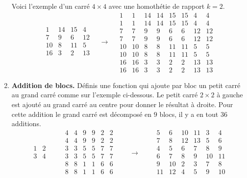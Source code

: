 \documentclass[11pt,class=report,crop=false]{standalone}
\begin{document}
\begin{activite}
\begin{enumerate}
Voici l'exemple d'un carré $4\times 4$ avec une homothétie de rapport $k=2$.
$$  
  \begin{array}{c|c|c|c}  
  1& 14& 15& 4\\\hline
  7& 9& 6& 12\\\hline
  10& 8& 11& 5\\\hline
  16& 3& 2& 13\\    
  \end{array} 
\quad  \longrightarrow \quad 
  \begin{array}{cc|cc|cc|cc}
 1& 1&14&14&15&15& 4& 4\\
  1& 1&14&14&15&15& 4& 4\\\hline
  7& 7& 9& 9& 6& 6&12&12\\
  7& 7& 9& 9& 6& 6&12&12\\\hline
 10&10& 8& 8&11&11& 5& 5\\
 10&10& 8& 8&11&11& 5& 5\\\hline
 16&16& 3& 3& 2& 2&13&13\\
 16&16& 3& 3& 2& 2&13&13
 \end{array}
  $$
  
\item \textbf{Addition de blocs.} Définis une fonction  qui ajoute par bloc un petit carré au grand carré comme sur l'exemple ci-dessous. Le petit carré $2 \times 2$ à gauche est ajouté au grand carré au centre pour donner le résultat à droite. Pour cette addition le grand carré est décomposé en $9$ blocs, il y a en tout $36$ additions.
$$
  \begin{array}{cc} 
  1& 2  \\
  3& 4  \\
  \end{array}
  \qquad
  \begin{array}{cc|cc|cc}  
  4& 4& 9& 9& 2& 2  \\
  4& 4& 9& 9& 2& 2  \\\hline
  3& 3& 5& 5& 7& 7  \\
  3& 3& 5& 5& 7& 7  \\\hline
  8& 8& 1& 1& 6& 6  \\
  8& 8& 1& 1& 6& 6  \\
  \end{array}
  \qquad  \longrightarrow \qquad
  \begin{array}{cc|cc|cc}
  5& 6&10&11& 3& 4  \\
  7& 8&12&13& 5& 6  \\\hline
  4& 5& 6& 7& 8& 9  \\
  6& 7& 8& 9&10&11  \\\hline
  9&10& 2& 3& 7& 8  \\
 11&12& 4& 5& 9&10  \\
  \end{array}
$$


\end{enumerate}
\end{activite}
\end{document}
